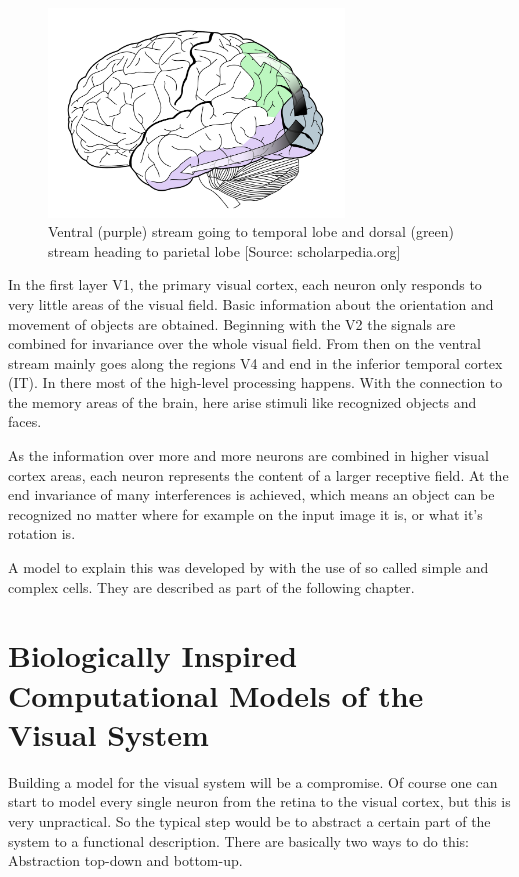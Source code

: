 		\begin{figure}[H]
			\centering
			\captionsetup{justification=centering,margin=2.3cm}
			\includegraphics[width=0.7\textwidth]{images/visual-stream2.pdf}
			\caption{Ventral (purple) stream going to temporal lobe and dorsal (green) stream heading to parietal lobe [Source: scholarpedia.org]}
		\end{figure}
		
		In the first layer V1, the primary visual cortex, each neuron only responds to very little areas of the visual field. Basic information about the orientation and movement of objects are obtained. Beginning with the V2 the signals are combined for invariance over the whole visual field. From then on the ventral stream mainly goes along the regions V4 and end in the inferior temporal cortex (IT). In there most of the high-level processing happens. With the connection to the memory areas of the brain, here arise stimuli like recognized objects and faces.
		
		As the information over more and more neurons are combined in higher visual cortex areas, each neuron represents the content of a larger receptive field. At the end invariance of many interferences is achieved, which means an object can be recognized no matter where for example on the input image it is, or what it's rotation is.
		
		A model to explain this was developed by \citeauthor{hubel1962receptive} with the use of so called simple and complex cells. They are described as part of the following chapter.
		
		
\chapter{Biologically Inspired Computational Models of the Visual System}

	Building a model for the visual system will be a compromise. Of course one can start to model every single neuron from the retina to the visual cortex, but this is very unpractical. So the typical step would be to abstract a certain part of the system to a functional description. There are basically two ways to do this: Abstraction top-down and bottom-up.
	
